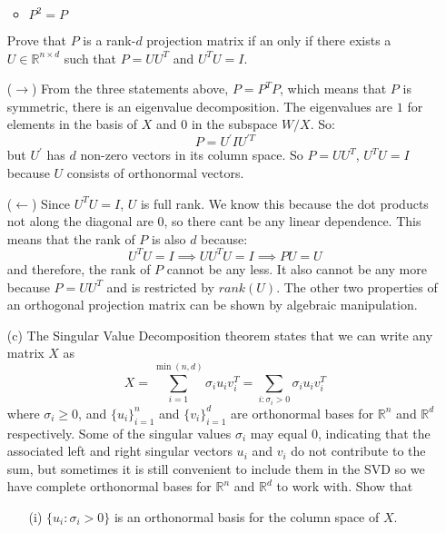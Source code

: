 \documentclass{article}
\begin{document}
\begin{itemize}
\begin{itemize}
                \item $P^{2} = P$
            \end{itemize}
        Prove that $P$ is a rank-$d$ projection matrix if an only if there exists a $U \in \mathbb{R}^{n \times d}$ such that $P = UU^{T}$ and $U^{T}U = I$.
            \begin{answer}
                ($\rightarrow$) From the three statements above, $P = P^{T}P$, which means that $P$ is symmetric, there is an eigenvalue decomposition. The eigenvalues are $1$ for elements in the basis of $X$ and $0$ in the subspace $W / X$. So:
                    \begin{equation*}
                        P = U^{\prime}I U^{\prime T}
                    \end{equation*}
                but $U^{\prime}$ has $d$ non-zero vectors in its column space. So $P = UU^{T}$, $U^{T}U = I$ because $U$ consists of orthonormal vectors.

                ($\leftarrow$) Since $U^{T}U = I$, $U$ is full rank. We know this because the dot products not along the diagonal are $0$, so there cant be any linear dependence. This means that the rank of $P$ is also $d$ because:
                    \begin{equation*}
                        U^{T}U = I \implies UU^{T}U = I \implies PU = U
                    \end{equation*}
                and therefore, the rank of $P$ cannot be any less. It also cannot be any more because $P = UU^{T}$ and is restricted by $rank(U)$. The other two properties of an orthogonal projection matrix can be shown by algebraic manipulation.
            \end{answer}

        \item [(c)] The Singular Value Decomposition theorem states that we can write any matrix $X$ as 
            \begin{equation*}
                X = \sum_{i = 1}^{\min(n, d)}\sigma_{i} u_{i} v_{i}^{T} = \sum_{i: \sigma_{i} > 0}\sigma_{i} u_{i} v_{i}^{T}
            \end{equation*}
        where $\sigma_{i} \geq 0$, and $\{u_{i}\}^{n}_{i = 1}$ and $\{v_{i}\}_{i = 1}^{d}$ are orthonormal bases for $\mathbb{R}^{n}$ and $\mathbb{R}^{d}$ respectively. Some of the singular values $\sigma_{i}$ may equal $0$, indicating that the associated left and right singular vectors $u_{i}$ and $v_{i}$ do not contribute to the sum, but sometimes it is still convenient to include them in the SVD so we have complete orthonormal bases for $\mathbb{R}^{n}$ and $\mathbb{R}^{d}$ to work with. Show that
            \begin{itemize}
                \item [(i)] $\{u_{i} : \sigma_{i} > 0\}$ is an orthonormal basis for the column space of $X$.
                    \begin{answer}
                        

\end{answer}
\end{itemize}
\end{itemize}
\end{document}
